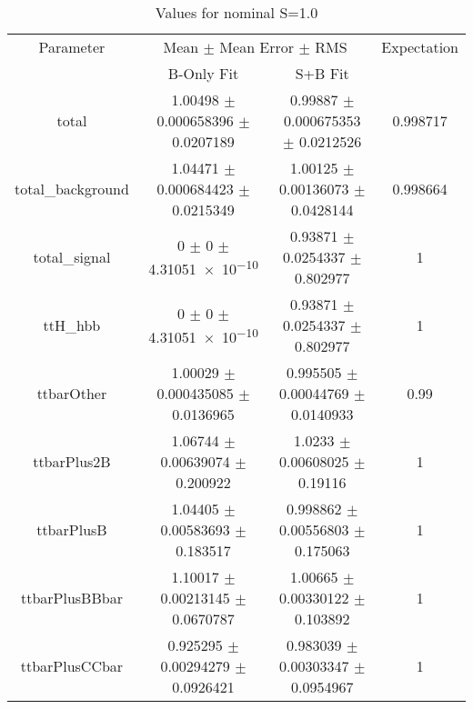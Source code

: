 \begin{table}
\centering
\caption{Values for nominal S=1.0}
\begin{tabular}{cccc}
\toprule
Parameter & \multicolumn{2}{c}{Mean $\pm$ Mean Error $\pm$ RMS} & Expectation\\
 & B-Only Fit & S+B Fit & \\
\midrule
total & \num{1.00498} $\pm$ \num{0.000658396} $\pm$ \num{0.0207189} & \num{0.99887} $\pm$ \num{0.000675353} $\pm$ \num{0.0212526} & \num{0.998717}\\
total\_background & \num{1.04471} $\pm$ \num{0.000684423} $\pm$ \num{0.0215349} & \num{1.00125} $\pm$ \num{0.00136073} $\pm$ \num{0.0428144} & \num{0.998664}\\
total\_signal & \num{0} $\pm$ \num{0} $\pm$ \num{4.31051e-10} & \num{0.93871} $\pm$ \num{0.0254337} $\pm$ \num{0.802977} & \num{1}\\
ttH\_hbb & \num{0} $\pm$ \num{0} $\pm$ \num{4.31051e-10} & \num{0.93871} $\pm$ \num{0.0254337} $\pm$ \num{0.802977} & \num{1}\\
ttbarOther & \num{1.00029} $\pm$ \num{0.000435085} $\pm$ \num{0.0136965} & \num{0.995505} $\pm$ \num{0.00044769} $\pm$ \num{0.0140933} & \num{0.99}\\
ttbarPlus2B & \num{1.06744} $\pm$ \num{0.00639074} $\pm$ \num{0.200922} & \num{1.0233} $\pm$ \num{0.00608025} $\pm$ \num{0.19116} & \num{1}\\
ttbarPlusB & \num{1.04405} $\pm$ \num{0.00583693} $\pm$ \num{0.183517} & \num{0.998862} $\pm$ \num{0.00556803} $\pm$ \num{0.175063} & \num{1}\\
ttbarPlusBBbar & \num{1.10017} $\pm$ \num{0.00213145} $\pm$ \num{0.0670787} & \num{1.00665} $\pm$ \num{0.00330122} $\pm$ \num{0.103892} & \num{1}\\
ttbarPlusCCbar & \num{0.925295} $\pm$ \num{0.00294279} $\pm$ \num{0.0926421} & \num{0.983039} $\pm$ \num{0.00303347} $\pm$ \num{0.0954967} & \num{1}\\
\bottomrule
\end{tabular}
\end{table}